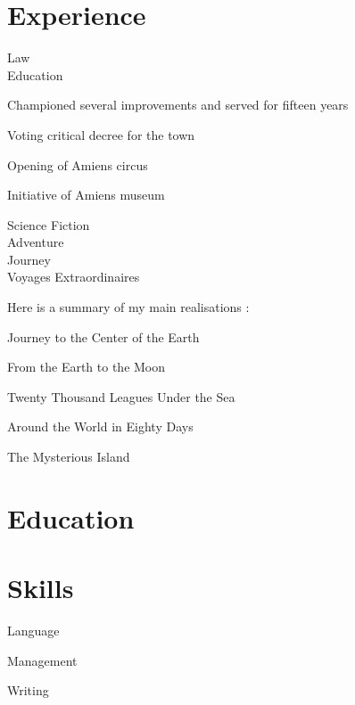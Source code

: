 \documentclass[a4paper,11pt]{cv4tw}%
\begin{document}
\section{Experience}
{Law\\Education}
	{ Championed several improvements and served for fifteen years
	\begin{cvmissions}
		\item Voting critical decree for the town
		\item Opening of Amiens circus
		\item Initiative of Amiens museum
	\end{cvmissions}
}
	{Science Fiction\\Adventure\\Journey\\Voyages Extraordinaires}
	{Here is a summary of my main realisations :
	\begin{cvmissions}
		\item Journey to the Center of the Earth
		\item From the Earth to the Moon 
		\item Twenty Thousand Leagues Under the Sea
		\item Around the World in Eighty Days
		\item The Mysterious Island
	\end{cvmissions}
}
\section{Education}
\section{Skills}
\begin{cvskills} {Language}
\end{cvskills}
\begin{cvskills}{Management}
\end{cvskills}
\begin{cvskills}{Writing}
\end{cvskills}
\end{document}
